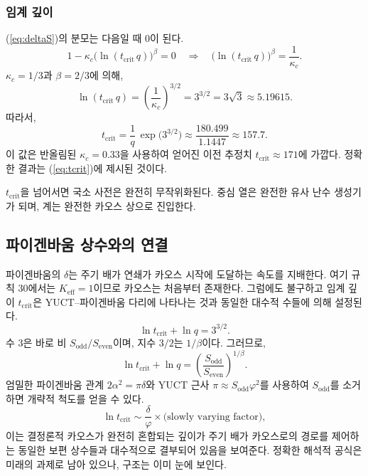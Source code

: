 \documentclass[11pt,a4paper]{article}
\begin{document}
	\subsubsection*{임계 깊이}
	(\ref{eq:deltaS})의 분모는 다음일 때 0이 된다.
	\[
	1 - \kappa_c\bigl(\ln(t_{\mathrm{crit}}\,q)\bigr)^{\beta} = 0
	\quad\Longrightarrow\quad
	\bigl(\ln(t_{\mathrm{crit}}\,q)\bigr)^{\beta} = \frac{1}{\kappa_c}.
	\]
	\(\kappa_c = 1/3\)과 \(\beta = 2/3\)에 의해,
	\begin{equation}
		\ln(t_{\mathrm{crit}}\,q) = \left(\frac{1}{\kappa_c}\right)^{3/2}
		= 3^{3/2} = 3\sqrt{3} \approx 5.19615.
		\label{eq:crit-ln}
	\end{equation}
	따라서,
	\begin{equation}
		\boxed{t_{\mathrm{crit}} = \frac{1}{q}\,
			\exp\!\bigl(3^{3/2}\bigr)
			\approx \frac{180.499}{1.1447} \approx 157.7}.
		\label{eq:tcrit}
	\end{equation}
	이 값은 반올림된 \(\kappa_c = 0.33\)을 사용하여 얻어진 이전 추정치 \(t_{\mathrm{crit}}\approx171\)에 가깝다. 정확한 결과는 (\ref{eq:tcrit})에 제시된 것이다.
	
	\(t_{\mathrm{crit}}\)을 넘어서면 국소 사전은 완전히 무작위화된다. 중심 열은 완전한 유사 난수 생성기가 되며, 계는 완전한 카오스 상으로 진입한다.
	
	\subsection{파이겐바움 상수와의 연결}
	\label{subsec:feigenbaum-link}
	
	파이겐바움의 \(\delta\)는 주기 배가 연쇄가 카오스 시작에 도달하는 속도를 지배한다. 여기 규칙 30에서는 \(K_{\mathrm{eff}}=1\)이므로 카오스는 처음부터 존재한다. 그럼에도 불구하고 임계 깊이 \(t_{\mathrm{crit}}\)은 YUCT–파이겐바움 다리에 나타나는 것과 동일한 대수적 수들에 의해 설정된다.
	\[
	\ln t_{\mathrm{crit}} + \ln q = 3^{3/2}.
	\]
	수 \(3\)은 바로 비 \(S_{\mathrm{odd}}/S_{\mathrm{even}}\)이며, 지수 \(3/2\)는 \(1/\beta\)이다. 그러므로,
	\[
	\ln t_{\mathrm{crit}} + \ln q =
	\left(\frac{S_{\mathrm{odd}}}{S_{\mathrm{even}}}\right)^{\!1/\beta}.
	\]
	엄밀한 파이겐바움 관계 \(2\alpha^{2} = \pi\delta\)와 YUCT 근사 \(\pi \approx S_{\mathrm{odd}}\varphi^{2}\)를 사용하여 \(S_{\mathrm{odd}}\)를 소거하면 개략적 척도를 얻을 수 있다.
	\[
	\ln t_{\mathrm{crit}} \sim \frac{\delta}{\varphi} \times
	\bigl(\text{slowly varying factor}\bigr),
	\]
	이는 결정론적 카오스가 완전히 혼합되는 깊이가 주기 배가 카오스로의 경로를 제어하는 동일한 보편 상수들과 대수적으로 결부되어 있음을 보여준다. 정확한 해석적 공식은 미래의 과제로 남아 있으나, 구조는 이미 눈에 보인다.
	
\end{document}
